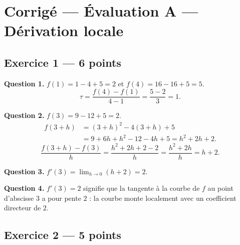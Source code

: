 
\section*{Corrigé — Évaluation A — Dérivation locale}

\subsection*{Exercice 1 — 6 points}


\textbf{Question 1.}
$f(1) = 1 - 4 + 5 = 2$ et $f(4) = 16 - 16 + 5 = 5$.
\[
\tau = \frac{f(4)-f(1)}{4-1} = \frac{5-2}{3} = 1.
\]

\textbf{Question 2.}
$f(3) = 9 - 12 + 5 = 2$.
\begin{align*}
f(3+h) &= (3+h)^2 - 4(3+h) + 5 \\
        &= 9 + 6h + h^2 - 12 - 4h + 5 = h^2 + 2h + 2.
\end{align*}
\[
\frac{f(3+h)-f(3)}{h} = \frac{h^2+2h+2-2}{h} = \frac{h^2+2h}{h} = h+2.
\]

\textbf{Question 3.}
$f'(3) = \lim_{h \to 0}(h+2) = 2.$

\textbf{Question 4.}
$f'(3) = 2$ signifie que la tangente à la courbe de $f$ au point d'abscisse $3$ a pour pente $2$ : la courbe monte localement avec un coefficient directeur de $2$.

\subsection*{Exercice 2 — 5 points}


